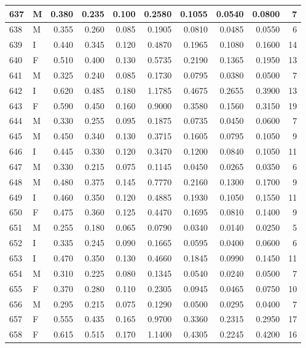 \documentclass[9pt,twocolumn,twoside,]{pnas-new}
\begin{document}
\begin{tabular}{l|l|r|r|r|r|r|r|r|r}
\hline
637 & M & 0.380 & 0.235 & 0.100 & 0.2580 & 0.1055 & 0.0540 & 0.0800 & 7\\
\hline
638 & M & 0.355 & 0.260 & 0.085 & 0.1905 & 0.0810 & 0.0485 & 0.0550 & 6\\
\hline
639 & I & 0.440 & 0.345 & 0.120 & 0.4870 & 0.1965 & 0.1080 & 0.1600 & 14\\
\hline
640 & F & 0.510 & 0.400 & 0.130 & 0.5735 & 0.2190 & 0.1365 & 0.1950 & 13\\
\hline
641 & M & 0.325 & 0.240 & 0.085 & 0.1730 & 0.0795 & 0.0380 & 0.0500 & 7\\
\hline
642 & I & 0.620 & 0.485 & 0.180 & 1.1785 & 0.4675 & 0.2655 & 0.3900 & 13\\
\hline
643 & F & 0.590 & 0.450 & 0.160 & 0.9000 & 0.3580 & 0.1560 & 0.3150 & 19\\
\hline
644 & M & 0.330 & 0.255 & 0.095 & 0.1875 & 0.0735 & 0.0450 & 0.0600 & 7\\
\hline
645 & M & 0.450 & 0.340 & 0.130 & 0.3715 & 0.1605 & 0.0795 & 0.1050 & 9\\
\hline
646 & I & 0.445 & 0.330 & 0.120 & 0.3470 & 0.1200 & 0.0840 & 0.1050 & 11\\
\hline
647 & M & 0.330 & 0.215 & 0.075 & 0.1145 & 0.0450 & 0.0265 & 0.0350 & 6\\
\hline
648 & M & 0.480 & 0.375 & 0.145 & 0.7770 & 0.2160 & 0.1300 & 0.1700 & 9\\
\hline
649 & I & 0.460 & 0.350 & 0.120 & 0.4885 & 0.1930 & 0.1050 & 0.1550 & 11\\
\hline
650 & F & 0.475 & 0.360 & 0.125 & 0.4470 & 0.1695 & 0.0810 & 0.1400 & 9\\
\hline
651 & M & 0.255 & 0.180 & 0.065 & 0.0790 & 0.0340 & 0.0140 & 0.0250 & 5\\
\hline
652 & I & 0.335 & 0.245 & 0.090 & 0.1665 & 0.0595 & 0.0400 & 0.0600 & 6\\
\hline
653 & I & 0.470 & 0.350 & 0.130 & 0.4660 & 0.1845 & 0.0990 & 0.1450 & 11\\
\hline
654 & M & 0.310 & 0.225 & 0.080 & 0.1345 & 0.0540 & 0.0240 & 0.0500 & 7\\
\hline
655 & F & 0.370 & 0.280 & 0.110 & 0.2305 & 0.0945 & 0.0465 & 0.0750 & 10\\
\hline
656 & M & 0.295 & 0.215 & 0.075 & 0.1290 & 0.0500 & 0.0295 & 0.0400 & 7\\
\hline
657 & F & 0.555 & 0.435 & 0.165 & 0.9700 & 0.3360 & 0.2315 & 0.2950 & 17\\
\hline
658 & F & 0.615 & 0.515 & 0.170 & 1.1400 & 0.4305 & 0.2245 & 0.4200 & 16\\

\end{tabular}
\end{document}
